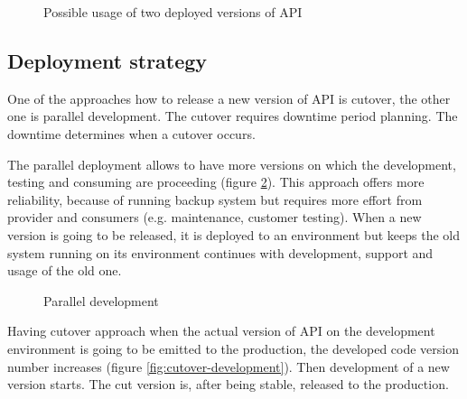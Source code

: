 \begin{figure}[htp] 
\caption{Possible usage of two deployed versions of API}
\label{fig:consumer-server}
\end{figure} 


\subsection{Deployment strategy}
One of the approaches how to release a new version of API is cutover, the other one is parallel development. The cutover requires downtime period planning. The downtime determines when a cutover occurs. 

The parallel deployment allows to have more versions on which the development, testing and consuming are proceeding (figure \ref{fig:parellel-development}). This approach offers more reliability, because of running backup system but requires more effort from provider and consumers (e.g. maintenance, customer testing). When a new version is going to be released, it is deployed to an environment but keeps the old system running on its environment continues with development, support and usage of the old one. 

\begin{figure}[htp] 
\caption{Parallel development}
\label{fig:parellel-development}
\end{figure} 

Having cutover approach when the actual version of API on the development environment is going to be emitted to the production, the developed code version number increases (figure \ref{fig:cutover-development}). Then development of a new version starts. The cut version is, after being stable, released to the production. 

